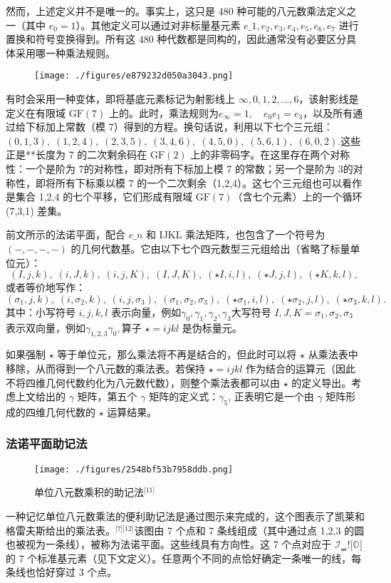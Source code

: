 然而，上述定义并不是唯一的。事实上，这只是 480 种可能的八元数乘法定义之一（其中 $e_{0} = 1$）。其他定义可以通过对非标量基元素 ${ e\_{1}, e_{2}, e_{3}, e_{4}, e_{5}, e_{6}, e_{7} }$ 进行置换和符号变换得到。所有这 $480$ 种代数都是同构的，因此通常没有必要区分具体采用哪一种乘法规则。
\begin{figure}[ht]
\centering
\texttt{[image: ./figures/e879232d050a3043.png]}
\caption{} \label{fig_BaYs_2}
\end{figure}
有时会采用一种变体，即将基底元素标记为射影线上 ${\infty, 0, 1, 2, \ldots, 6}$，该射影线是定义在有限域 $\mathrm{GF}(7)$ 上的。此时，乘法规则为$e_{\infty} = 1, \quad e_{0} e_{1} = e_{3}$，以及所有通过给下标加上常数（模 7）得到的方程。换句话说，利用以下七个三元组：$(0,1,3), \; (1,2,4), \; (2,3,5), \; (3,4,6), \; (4,5,0), \; (5,6,1), \; (6,0,2)$.这些正是**长度为 7 的二次剩余码在 $\mathrm{GF}(2)$ 上的非零码字。在这里存在两个对称性：一个是阶为 7的对称性，即对所有下标加上模 7 的常数；另一个是阶为 3的对称性，即将所有下标乘以模 7 的一个二次剩余（1,2,4）。这七个三元组也可以看作是集合 {1,2,4} 的七个平移，它们形成有限域 $\mathrm{GF}(7)$（含七个元素）上的一个循环 (7,3,1) 差集。

前文所示的法诺平面，配合 $e\_{n}$ 和 IJKL 乘法矩阵，也包含了一个符号为 $(-,-,-,-)$ 的几何代数基。它由以下七个四元数型三元组给出（省略了标量单位元）：
$$
(I, j, k), \; (i, J, k), \; (i, j, K), \; (I, J, K), \; (\star I, i, l), \; (\star J, j, l), \; (\star K, k, l),~
$$
或者等价地写作：
$$
(\sigma_{1}, j, k), \; (i, \sigma_{2}, k), \; (i, j, \sigma_{3}), \; (\sigma_{1}, \sigma_{2}, \sigma_{3}), \; 
(\star \sigma_{1}, i, l), \; (\star \sigma_{2}, j, l), \; (\star \sigma_{3}, k, l).~
$$
其中：小写符号 ${i, j, k, l}$ 表示向量，例如${\gamma_{0}, \gamma_{1}, \gamma_{2}, \gamma_{3}}$大写符号 ${I, J, K} = {\sigma_{1}, \sigma_{2}, \sigma_{3}}$ 表示双向量，例如$\gamma_{{1,2,3}} \gamma_{0},$算子 $\star = i j k l$ 是伪标量元。

如果强制 $\star$ 等于单位元，那么乘法将不再是结合的，但此时可以将 $\star$ 从乘法表中移除，从而得到一个八元数的乘法表。若保持 $\star = i j k l$ 作为结合的运算元（因此不将四维几何代数约化为八元数代数），则整个乘法表都可以由 $\star$ 的定义导出。考虑上文给出的 $\gamma$ 矩阵，第五个 $\gamma$ 矩阵的定义式：$\gamma_{5}$,
正表明它是一个由 $\gamma$ 矩阵形成的四维几何代数的 $\star$ 运算结果。
\subsubsection{法诺平面助记法}
\begin{figure}[ht]
\centering
\texttt{[image: ./figures/2548bf53b7958ddb.png]}
\caption{单位八元数乘积的助记法\(^\text{[11]}\)} \label{fig_BaYs_3}
\end{figure}
一种记忆单位八元数乘法的便利助记法是通过图示来完成的，这个图表示了凯莱和格雷夫斯给出的乘法表。\(^\text{[7][12]}\)该图由 7 个点和 7 条线组成（其中通过点 1,2,3 的圆也被视为一条线），被称为法诺平面。这些线具有方向性。这 7 个点对应于 $\operatorname{\mathcal{I_{m}}}!\bigl[\mathbb{O}\bigr]$ 的 7 个标准基元素（见下文定义）。任意两个不同的点恰好确定一条唯一的线，每条线也恰好穿过 3 个点。

